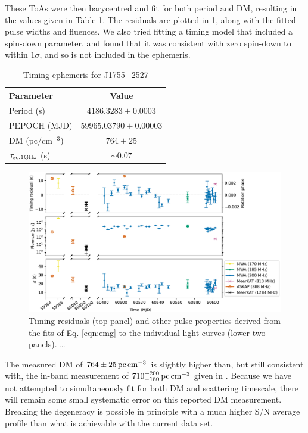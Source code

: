\documentclass[fleqn,usenatbib]{mnras}
\newcommand{\src}{J1755$-$2527}
\begin{document}
These ToAs were then barycentred and fit for both period and DM, resulting in the values given in Table \ref{tbl:ephemeris}.
The residuals are plotted in \ref{fig:pulse_details}, along with the fitted pulse widths and fluences.
We also tried fitting a timing model that included a spin-down parameter, and found that it was consistent with zero spin-down to within $1\sigma$, and so is not included in the ephemeris.

\begin{table}
  \centering
  \caption{Timing ephemeris for \src{}}
  \label{tbl:ephemeris}
  \begin{tabular}{lc}
    \hline
    Parameter & Value \\
    \hline
    Period (s) & $4186.3283 \pm 0.0003$ \\
    PEPOCH (MJD) & $59965.03790 \pm 0.00003$ \\
    DM (pc/cm$^{-3}$) & $764 \pm 25$ \\
    $\tau_{\rm sc,1 GHz}$ (s) & ${\sim}0.07$ \\
    \hline
  \end{tabular}
\end{table}

\begin{figure}[th]
  \centering
  \includegraphics[width=0.98\linewidth]{pulse_details.pdf}
  \caption{Timing residuals (top panel) and other pulse properties derived from the fits of Eq. \eqref{eqn:emg} to the individual light curves (lower two panels). \dots}
  \label{fig:pulse_details}
\end{figure}

The measured DM of $764 \pm 25\,{\rm pc}\,{\rm cm}^{-3}$ is slightly higher than, but still consistent with, the in-band measurement of $710^{+200}_{-180}\,{\rm pc}\,{\rm cm}^{-3}$ given in .
Because we have not attempted to simultaneously fit for both DM and scattering timescale, there will remain some small systematic error on this reported DM measurement.
Breaking the degeneracy is possible in principle with a much higher S/N average profile than what is achievable with the current data set.
\end{document}
